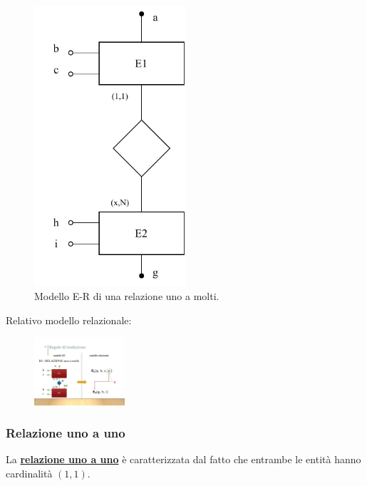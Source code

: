 \documentclass[a4paper]{article}
\begin{document}
	\begin{figure}[!htp]
		\centering
		\includegraphics[width=0.5\textwidth]{img/relazionale_uno_a_molti.pdf}
		\caption{Modello E-R di una relazione uno a molti.}
	\end{figure}
	
	\noindent
	Relativo modello relazionale:
	
	\begin{figure}[!htp]
		\centering
		\includegraphics[width=0.3\textwidth]{img/relazionale_uno_a_molti2.pdf}
	\end{figure}

	\newpage
	
	\subsubsection{Relazione uno a uno}
	
	La \textcolor{Red3}{\textbf{\underline{relazione uno a uno}}} è caratterizzata dal fatto che entrambe le entità hanno cardinalità $\left(1,1\right)$.
	
\end{document}
